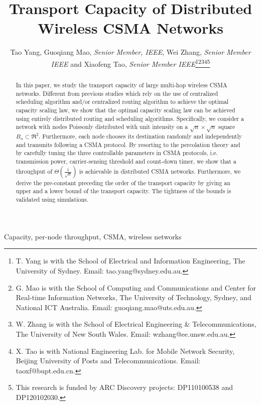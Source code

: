 \documentclass[english]{IEEEtran}
\theoremstyle{plain}
\theoremstyle{plain}
\theoremstyle{plain}
\theoremstyle{remark}
\begin{document}
\title{Transport Capacity of Distributed Wireless CSMA Networks}


\author{Tao Yang, Guoqiang Mao, \emph{Senior Member, IEEE}, Wei Zhang, \emph{Senior
Member IEEE} and Xiaofeng Tao, \emph{Senior Member IEEE}\thanks{T. Yang is with the School of Electrical and Information Engineering,
The University of Sydney. Email: tao.yang@sydney.edu.au.}\emph{}\thanks{G. Mao is with the School of Computing and Communications and Center
for Real-time Information Networks, The University of Technology,
Sydney, and National ICT Australia. Email: guoqiang.mao@uts.edu.au.}\emph{}\thanks{W. Zhang is with the School of Electrical Engineering \& Telecommunications,
The University of New South Wales. Email: wzhang@ee.unsw.edu.au.}\emph{}\thanks{X. Tao is with National Engineering Lab. for Mobile Network Security, Beijing University of Posts and Telecommunications. Email: taoxf@bupt.edu.cn.}\emph{}\thanks{This research is funded by ARC Discovery projects: DP110100538 and
DP120102030.}}
\maketitle
\begin{abstract}
In this paper, we study the transport capacity of large multi-hop
wireless CSMA networks. Different from previous studies which rely
on the use of centralized scheduling algorithm and/or centralized
routing algorithm to achieve the optimal capacity scaling law, we
show that the optimal capacity scaling law can be achieved using entirely
distributed routing and scheduling algorithms. Specifically, we consider
a network with nodes Poissonly distributed with unit intensity on
a $\sqrt{n}\times\sqrt{n}$ square $B_{n}\subset\Re^{2}$. Furthermore,
each node chooses its destination randomly and independently and transmits
following a CSMA protocol. By resorting to the percolation theory
and by carefully tuning the three controllable parameters in CSMA
protocols, i.e. transmission power, carrier-sensing threshold and
count-down timer, we show that a throughput of $\Theta\left(\frac{1}{\sqrt{n}}\right)$
is achievable in distributed CSMA networks. Furthermore, we derive
the pre-constant preceding the order of the transport capacity by
giving an upper and a lower bound of the transport capacity. The tightness
of the bounds is validated using simulations.\end{abstract}
\begin{IEEEkeywords}
Capacity, per-node throughput, CSMA, wireless networks 
\end{IEEEkeywords}
\end{document}
